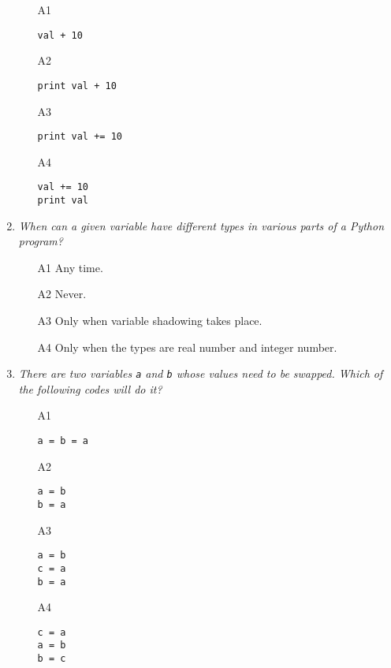 \begin{enumerate}
\begin{enumerate}
\item[A1] 
\begin{verbatim}
val + 10
\end{verbatim}
\item[A2] 
\begin{verbatim}
print val + 10
\end{verbatim}
\item[A3] 
\begin{verbatim}
print val += 10
\end{verbatim}
\item[A4] 
\begin{verbatim}
val += 10
print val
\end{verbatim}
\end{enumerate}

\vspace{6mm}

\item {\em When can a given variable have different types in various parts 
of a Python program?}\\

\begin{enumerate}
\item[A1] Any time.
\item[A2] Never.
\item[A3] Only when variable shadowing takes place.
\item[A4] Only when the types are real number and integer number.
\end{enumerate}

\vspace{6mm}

\item {\em There are two variables {\tt a} and {\tt b} whose values need to be swapped. Which of the 
following codes will do it?}\\

\begin{enumerate}
\item[A1] 
\begin{verbatim}
a = b = a
\end{verbatim}
\item[A2] 
\begin{verbatim}
a = b
b = a
\end{verbatim}
\item[A3] 
\begin{verbatim}
a = b
c = a
b = a
\end{verbatim}
\item[A4] 
\begin{verbatim}
c = a
a = b
b = c
\end{verbatim}
\end{enumerate}


\end{enumerate}
